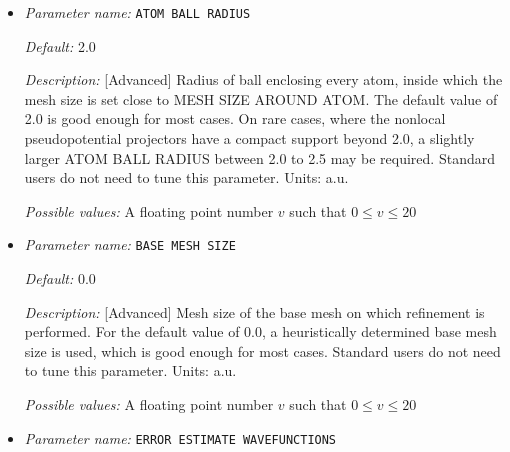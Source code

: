 \begin{itemize}
\item {\it Parameter name:} {\tt ATOM BALL RADIUS}
\label{parameters:Finite element mesh parameters/Auto mesh generation parameters/ATOM BALL RADIUS}
\label{parameters:Finite_20element_20mesh_20parameters/Auto_20mesh_20generation_20parameters/ATOM_20BALL_20RADIUS}




{\it Default:} 2.0


{\it Description:} [Advanced] Radius of ball enclosing every atom, inside which the mesh size is set close to MESH SIZE AROUND ATOM. The default value of 2.0 is good enough for most cases. On rare cases, where the nonlocal pseudopotential projectors have a compact support beyond 2.0, a slightly larger ATOM BALL RADIUS between 2.0 to 2.5 may be required. Standard users do not need to tune this parameter. Units: a.u.


{\it Possible values:} A floating point number $v$ such that $0 \leq v \leq 20$
\item {\it Parameter name:} {\tt BASE MESH SIZE}
\label{parameters:Finite element mesh parameters/Auto mesh generation parameters/BASE MESH SIZE}
\label{parameters:Finite_20element_20mesh_20parameters/Auto_20mesh_20generation_20parameters/BASE_20MESH_20SIZE}




{\it Default:} 0.0


{\it Description:} [Advanced] Mesh size of the base mesh on which refinement is performed. For the default value of 0.0, a heuristically determined base mesh size is used, which is good enough for most cases. Standard users do not need to tune this parameter. Units: a.u.


{\it Possible values:} A floating point number $v$ such that $0 \leq v \leq 20$
\item {\it Parameter name:} {\tt ERROR ESTIMATE WAVEFUNCTIONS}
\label{parameters:Finite element mesh parameters/Auto mesh generation parameters/ERROR ESTIMATE WAVEFUNCTIONS}
\label{parameters:Finite_20element_20mesh_20parameters/Auto_20mesh_20generation_20parameters/ERROR_20ESTIMATE_20WAVEFUNCTIONS}





\end{itemize}

